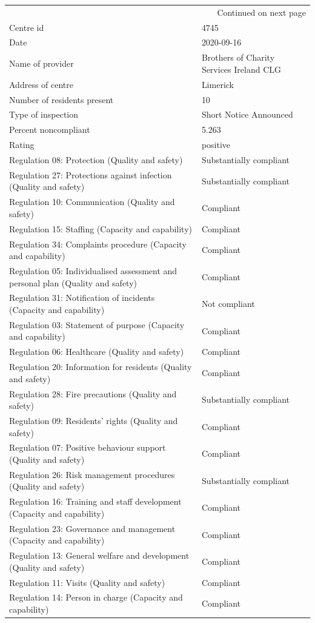 \documentclass[a4paper,11pt,twoside]{article}
\begin{document}
\begin{longtable}{p{11cm}|p{5cm}}
\hline
\endhead
\hline\multicolumn{2}{r}{Continued on next page} \\
\endfoot
\endlastfoot
\hline
Centre id & 4745\\[0pt]
Date & 2020-09-16\\[0pt]
Name of provider & Brothers of Charity Services Ireland CLG\\[0pt]
Address of centre & Limerick\\[0pt]
Number of residents present & 10\\[0pt]
Type of inspection & Short Notice Announced\\[0pt]
Percent noncompliant & 5.263\\[0pt]
Rating & positive\\[0pt]
Regulation 08: Protection (Quality and safety) & Substantially compliant\\[0pt]
Regulation 27: Protections against infection (Quality and safety) & Substantially compliant\\[0pt]
Regulation 10: Communication (Quality and safety) & Compliant\\[0pt]
Regulation 15: Staffing (Capacity and capability) & Compliant\\[0pt]
Regulation 34: Complaints procedure (Capacity and capability) & Compliant\\[0pt]
Regulation 05: Individualised assessment and personal plan (Quality and safety) & Compliant\\[0pt]
Regulation 31: Notification of incidents (Capacity and capability) & Not compliant\\[0pt]
Regulation 03: Statement of purpose (Capacity and capability) & Compliant\\[0pt]
Regulation 06: Healthcare (Quality and safety) & Compliant\\[0pt]
Regulation 20: Information for residents (Quality and safety) & Compliant\\[0pt]
Regulation 28: Fire precautions (Quality and safety) & Substantially compliant\\[0pt]
Regulation 09: Residents' rights (Quality and safety) & Compliant\\[0pt]
Regulation 07: Positive behaviour support (Quality and safety) & Compliant\\[0pt]
Regulation 26: Risk management procedures (Quality and safety) & Substantially compliant\\[0pt]
Regulation 16: Training and staff development (Capacity and capability) & Compliant\\[0pt]
Regulation 23: Governance and management (Capacity and capability) & Compliant\\[0pt]
Regulation 13: General welfare and development (Quality and safety) & Compliant\\[0pt]
Regulation 11: Visits (Quality and safety) & Compliant\\[0pt]
Regulation 14: Person in charge (Capacity and capability) & Compliant\\[0pt]
\end{longtable}
\end{document}
